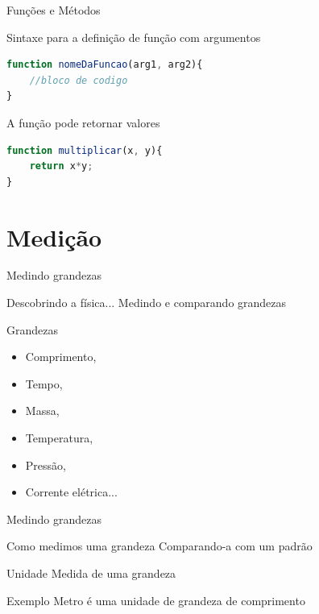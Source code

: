 \documentclass[xcolor=dvipsnames,table]{beamer}
\begin{document}
\begin{frame}[fragile]{Funções e Métodos}
	\begin{block}{Sintaxe para a definição de função com argumentos}
		\begin{lstlisting}[language=JavaScript]
function nomeDaFuncao(arg1, arg2){
	//bloco de codigo
}
\end{lstlisting}	
	\end{block} 
	\begin{block}{A função pode retornar valores}
		\begin{lstlisting}[language=JavaScript]
function multiplicar(x, y){
	return x*y;
}
\end{lstlisting}	
	\end{block}
\end{frame}

\section{Medição}
	\begin{frame}{Medindo grandezas}
		\begin{block}{Descobrindo a física...}
			Medindo e comparando grandezas
		\end{block} \pause
		\begin{block}{Grandezas}
			\begin{itemize}
				\item Comprimento, 
				\item Tempo, 
				\item Massa, 
				\item Temperatura, 
				\item Pressão, 
				\item Corrente elétrica...
			\end{itemize}
		\end{block}
	\end{frame}
	
	\begin{frame}{Medindo grandezas}
		\begin{block}{Como medimos uma grandeza}
			Comparando-a com um padrão
		\end{block}	\pause
		\begin{block}{Unidade}
			Medida de uma grandeza
		\end{block} \pause
		\begin{block}{Exemplo}
			Metro é uma unidade de grandeza de comprimento
		\end{block}	
	\end{frame}
	
\end{document}
